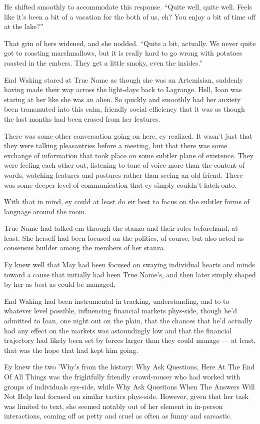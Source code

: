 He shifted smoothly to accommodate this response. ``Quite well, quite well. Feels like it's been a bit of a vacation for the both of us, eh? You enjoy a bit of time off at the lake?''

That grin of hers widened, and she nodded. ``Quite a bit, actually. We never quite got to roasting marshmallows, but it is really hard to go wrong with potatoes roasted in the embers. They get a little smoky, even the insides.''

End Waking stared at True Name as though she was an Artemisian, suddenly having made their way across the light-days back to Lagrange. Hell, Ioan was staring at her like she was an alien. So quickly and smoothly had her anxiety been transmuted into this calm, friendly social efficiency that it was as though the last months had been erased from her features.

There was some other conversation going on here, ey realized. It wasn't just that they were talking pleasantries before a meeting, but that there was some exchange of information that took place on some subtler plane of existence. They were feeling each other out, listening to tone of voice more than the content of words, watching features and postures rather than seeing an old friend. There was some deeper level of communication that ey simply couldn't latch onto.

With that in mind, ey could at least do eir best to focus on the subtler forms of language around the room.

True Name had talked em through the stanza and their roles beforehand, at least. She herself had been focused on the politics, of course, but also acted as consensus builder among the members of her stanza.

Ey knew well that May had been focused on swaying individual hearts and minds toward a cause that initially had been True Name's, and then later simply shaped by her as best as could be managed.

End Waking had been instrumental in tracking, understanding, and to to whatever level possible, influencing financial markets phys-side, though he'd admitted to Ioan, one night out on the plain, that the chances that he'd actually had any effect on the markets was astoundingly low and that the financial trajectory had likely been set by forces larger than they could manage — at least, that was the hope that had kept him going.

Ey knew the two 'Why's from the history: Why Ask Questions, Here At The End Of All Things was the frightfully friendly crowd-rouser who had worked with groups of individuals sys-side, while Why Ask Questions When The Answers Will Not Help had focused on similar tactics phys-side. However, given that her task was limited to text, she seemed notably out of her element in in-person interactions, coming off as petty and cruel as often as funny and sarcastic.

